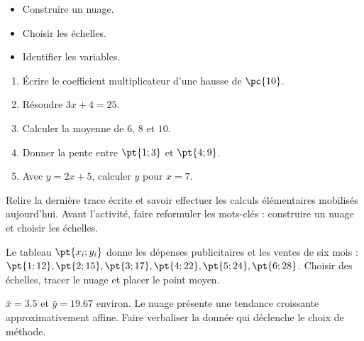 \begin{objectives}\begin{itemize}\item Construire un nuage.\item Choisir les échelles.\item Identifier les variables.\end{itemize}\end{objectives}
\begin{fluency}\begin{enumerate}\item Écrire le coefficient multiplicateur d'une hausse de $\pc{10}$. \item Résoudre $3x+4=25$. \item Calculer la moyenne de $6$, $8$ et $10$. \item Donner la pente entre $\pt{1;3}$ et $\pt{4;9}$. \item Avec $y=2x+5$, calculer $y$ pour $x=7$. \end{enumerate}\end{fluency}
\begin{prerequisites}Relire la dernière trace écrite et savoir effectuer les calculs élémentaires mobilisés aujourd'hui. Avant l'activité, faire reformuler les mots-clés : construire un nuage et choisir les échelles.\end{prerequisites}

\begin{activity}
Le tableau $\pt{x_i;y_i}$ donne les dépenses publicitaires et les ventes de six mois : $\pt{1;12},\pt{2;15},\pt{3;17},\pt{4;22},\pt{5;24},\pt{6;28}$. Choisir des échelles, tracer le nuage et placer le point moyen.
\begin{center}\end{center}
\end{activity}
\begin{solution}$\bar x=\num{3,5}$ et $\bar y=\num{19,67}$ environ. Le nuage présente une tendance croissante approximativement affine. Faire verbaliser la donnée qui déclenche le choix de méthode.\end{solution}

